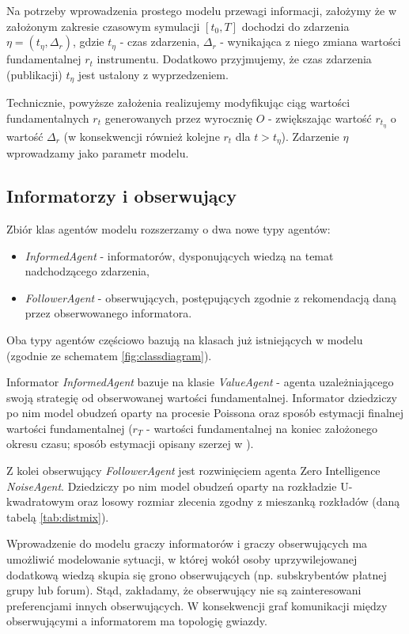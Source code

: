 Na potrzeby wprowadzenia prostego modelu przewagi informacji, założymy że w założonym zakresie czasowym symulacji $[t_0, T]$ dochodzi do zdarzenia $\eta = (t_{\eta},\Delta_{r})$, gdzie $t_{\eta}$ - czas zdarzenia, $\Delta_{r}$ - wynikająca z niego zmiana wartości fundamentalnej $r_t$ instrumentu. Dodatkowo przyjmujemy, że czas zdarzenia (publikacji) $t_{\eta}$ jest ustalony z wyprzedzeniem. 

Technicznie, powyższe założenia realizujemy modyfikując ciąg wartości fundamentalnych $r_t$ generowanych przez wyrocznię $O$ - zwiększając wartość $r_{t_{\eta}}$ o wartość $\Delta_{r}$ (w konsekwencji również kolejne $r_t$ dla $t>t_{\eta}$). Zdarzenie $\eta$ wprowadzamy jako parametr modelu. 

\subsection{Informatorzy i obserwujący}
Zbiór klas agentów modelu rozszerzamy o dwa nowe typy agentów:
\begin{itemize}
\item \textit{InformedAgent} - informatorów, dysponujących wiedzą na temat nadchodzącego zdarzenia,
\item \textit{FollowerAgent} - obserwujących, postępujących zgodnie z rekomendacją daną przez obserwowanego informatora. 
\end{itemize}
Oba typy agentów częściowo bazują na klasach już istniejących w modelu (zgodnie ze  schematem \ref{fig:classdiagram}). 

Informator \textit{InformedAgent} bazuje na klasie \textit{ValueAgent} - agenta uzależniającego swoją strategię od obserwowanej wartości fundamentalnej. Informator dziedziczy po nim model obudzeń oparty na procesie Poissona oraz sposób estymacji finalnej wartości fundamentalnej ($r_T$ - wartości fundamentalnej na koniec założonego okresu czasu; sposób estymacji opisany szerzej w \cite{abides_explanation}). 

Z kolei obserwujący \textit{FollowerAgent} jest rozwinięciem agenta Zero Intelligence \textit{NoiseAgent}. Dziedziczy po nim model obudzeń oparty na rozkładzie U-kwadratowym oraz losowy rozmiar zlecenia zgodny z mieszanką rozkładów (daną tabelą \ref{tab:distmix}).

Wprowadzenie do modelu graczy informatorów i graczy obserwujących ma umożliwić modelowanie sytuacji, w której wokół osoby uprzywilejowanej dodatkową wiedzą skupia się grono obserwujących (np. subskrybentów płatnej grupy lub forum). Stąd, zakładamy, że obserwujący nie są zainteresowani preferencjami innych obserwujących. W konsekwencji graf komunikacji między obserwującymi a informatorem ma topologię gwiazdy. 

